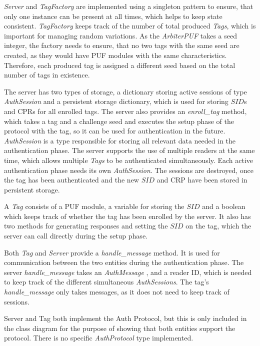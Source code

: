 \emph{Server} and \emph{TagFactory} are implemented using a singleton pattern to ensure, that only one instance
can be present at all times, which helps to keep state consistent.
\emph{TagFactory} keeps track of the number of total produced \emph{Tags}, which is important for managing random variations.
As the \emph{ArbiterPUF} takes a seed integer, the factory needs to ensure, that no two tags with the same
seed are created, as they would have PUF modules with the same characteristics.
Therefore, each produced tag is assigned a different seed based on the total number of tags in existence.

The server has two types of storage, a dictionary storing active sessions of type \emph{AuthSession} and
a persistent storage dictionary, which is used for storing $SID$s and CPRs for all enrolled tags.
The server also provides an \emph{enroll\_tag} method, which takes a tag and a challenge seed and
executes the setup phase of the protocol with the tag, so it can be used for authentication in the future.
\emph{AuthSession} is a type responsible for storing all relevant data needed in the authentication phase.
The server supports the use of multiple readers at the same time, which allows multiple \emph{Tags} to be
authenticated simultaneously. Each active authentication phase needs its own \emph{AuthSession}.
The sessions are destroyed, once the tag has been authenticated and the new $SID$ and CRP have been stored
in persistent storage.

A \emph{Tag} consists of a PUF module, a variable for storing the $SID$ and a boolean which keeps track of
whether the tag has been enrolled by the server.
It also has two methods for generating responses and setting the $SID$ on the tag, which the server can call directly
during the setup phase.

Both \emph{Tag} and \emph{Server} provide a \emph{handle\_message} method.
It is used for communication between the two entities during the authentication phase.
The server \emph{handle\_message} takes an \emph{AuthMessage} , and a reader ID, which is needed to keep track of the different
simultaneous \emph{AuthSessions}. The tag's \emph{handle\_message} only takes messages, as it does not need to
keep track of sessions.

Server and Tag both implement the Auth Protocol, but this is only included in the class diagram for the purpose of
showing that both entities support the protocol. There is no specific \emph{AuthProtocol} type implemented.

